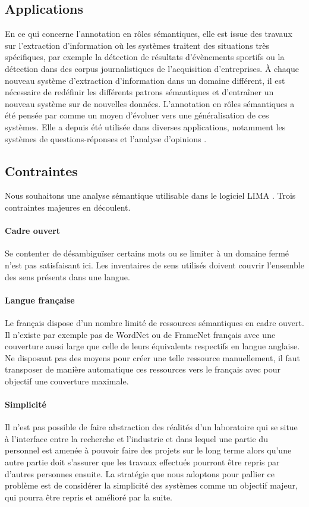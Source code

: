 \subsection{Applications}

En ce qui concerne l'annotation en rôles sémantiques, elle est issue des
travaux sur l'extraction d'information où les systèmes traitent des situations
très spécifiques, par exemple la détection de résultats d'évènements sportifs
ou la détection dans des corpus journalistiques de l'acquisition d'entreprises.
À chaque nouveau système d'extraction d'information dans un domaine différent,
il est nécessaire de redéfinir les différents patrons sémantiques et
d'entraîner un nouveau système sur de nouvelles données. L'annotation en rôles
sémantiques a été pensée par \cite{gildea2002automatic} comme un moyen
d'évoluer vers une généralisation de ces systèmes. Elle a depuis été utilisée
dans diverses applications, notamment les systèmes de questions-réponses
\citep{shen2007using} et l'analyse d'opinions \citep{das2012structure}.

\subsection{Contraintes}

Nous souhaitons une analyse sémantique utilisable dans le logiciel LIMA
\citep{besancon2010lima}. Trois contraintes majeures en découlent.

\paragraph{Cadre ouvert} Se contenter de désambiguïser certains mots ou se
limiter à un domaine fermé n'est pas satisfaisant ici. Les inventaires de sens
utilisés doivent couvrir l'ensemble des sens présents dans une langue.

\paragraph{Langue française} Le français dispose d'un nombre limité de
ressources sémantiques en cadre ouvert. Il n'existe par exemple pas de WordNet
ou de FrameNet français avec une couverture aussi large que celle de leurs
équivalents respectifs en langue anglaise. Ne disposant pas des moyens pour
créer une telle ressource manuellement, il faut transposer de manière
automatique ces ressources vers le français avec pour objectif une couverture
maximale.

\paragraph{Simplicité} Il n'est pas possible de faire abstraction des réalités
d'un laboratoire qui se situe à l'interface entre la recherche et l'industrie
et dans lequel une partie du personnel est amenée à pouvoir faire des projets
sur le long terme alors qu'une autre partie doit s'assurer que les travaux
effectués pourront être repris par d'autres personnes ensuite. La stratégie que
nous adoptons pour pallier ce problème est de considérer la simplicité des
systèmes comme un objectif majeur, qui pourra être repris et amélioré par la
suite.

